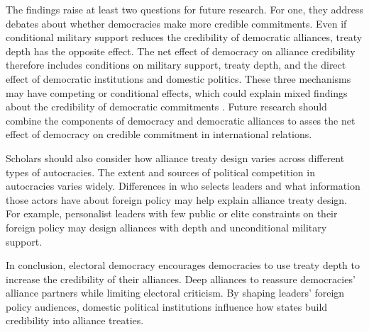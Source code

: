 \documentclass[12pt]{article}
\begin{document}
The findings raise at least two questions for future research.  
For one, they address debates about whether democracies make more credible commitments. 
Even if conditional military support reduces the credibility of democratic alliances, treaty depth has the opposite effect. 
The net effect of democracy on alliance credibility therefore includes conditions on military support, treaty depth, and the direct effect of democratic institutions and domestic politics. 
These three mechanisms may have competing or conditional effects, which could explain mixed findings about the credibility of democratic commitments \citep{Schultz1999, Leeds1999, Thyne2012, DownesSechser2012, PotterBaum2014}.
Future research should combine the components of democracy and democratic alliances to asses the net effect of democracy on credible commitment in international relations. 


Scholars should also consider how alliance treaty design varies across different types of autocracies. 
The extent and sources of political competition in autocracies varies widely. 
Differences in who selects leaders and what information those actors have about foreign policy \citep{Weeks2008} may help explain alliance treaty design.
For example, personalist leaders with few public or elite constraints on their foreign policy may design alliances with depth and unconditional military support. 


In conclusion, electoral democracy encourages democracies to use treaty depth to increase the credibility of their alliances. 
Deep alliances to reassure democracies' alliance partners while limiting electoral criticism. 
By shaping leaders' foreign policy audiences, domestic political institutions influence how states build credibility into alliance treaties.




 
 
\end{document}
